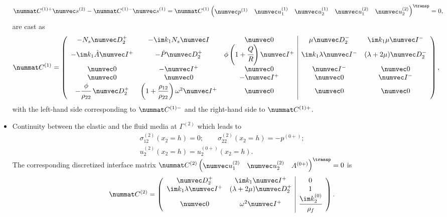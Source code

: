 \begin{itemize}
    \begin{equation}
        \nummat C^{(1)+} \numvec s^{(2)} - \nummat C^{(1)-} \numvec s^{(1)} =
        \nummat C^{(1)} \begin{pmatrix} \numvec p^{(1)} & \numvec u^{(1)}_{1} & \numvec u^{(1)}_{2} & \numvec u^{(2)}_{1} & \numvec u^{(2)}_{2}
        \end{pmatrix}^\transp = 0,
    \end{equation}
    are cast as
    \begin{equation} \nummat C^{(1)}  = 
       \left(
        \begin{array}{ccc|cc}
            - N_s\numvec D_{2}^+ & -\im  k_1  N_s \numvec I & \numvec 0 & \mu \numvec D_{2}^- & \im  k_1 \mu \numvec I^- \\
            -\im  k_1 \hat A \numvec I^+ & -\hat P \numvec D_{2}^+ & \phi \left(1 + \cfrac{ Q}{ R}\right) \numvec I^+ & \im  k_1 \lambda\numvec I^- & (\lambda + 2\mu )\numvec D_{2}^-  \\
            \numvec 0 & -\numvec I^+ & \numvec 0 & \numvec I^- & \numvec 0  \\
            \numvec 0 & \numvec 0 & -\numvec I^+ & \numvec 0 & \numvec I^-  \\
            -\cfrac{\phi}{ \rho_{22}} \:\numvec D_{2}^+ & \left( 1 +\displaystyle\frac{ \rho_{12}} { \rho_{22}} \right)\omega^2\numvec I^+ & \numvec 0 & \numvec 0 & \numvec 0 \\
        \end{array} \right),
        \label{eq:poro_elastic_cont_matrix}
    \end{equation}
    with the left-hand side corresponding to $\nummat C^{(1)-}$ and the right-hand side to $\nummat C^{(1)+}$.
    \item Continuity between the elastic and the fluid media at $\Gamma^{(2)}$ which leads to
    \begin{equation}
    \begin{array}{c}
            \sigma_{12}^{(2)}(x_2=h) = 0; \quad \quad \sigma_{22}^{(2)}(x_2=h) = -p^{(0+)}; \\ 
             u_2^{(2)}(x_2=h)=u_2^{(0+)}(x_2=h).
             \end{array}
    \end{equation}
    The corresponding discretized interface matrix $\nummat C^{(2)} \begin{pmatrix} \numvec u^{(2)}_1 & \numvec u^{(2)}_2 & A^{(0+)}\end{pmatrix}^\transp = 0$ is 
        \begin{equation} \nummat C^{(2)} = 
            \left( \begin{array}{cc|c}
                    \numvec D_{2}^+ & \im  k_1 \numvec I^+ & 0 \\
                    \im  k_1 \lambda \numvec I^+ & (\lambda + 2\mu)\numvec D_{2}^+ & 1 \\
                    \numvec 0 & \omega^2 \numvec I^+ & \cfrac {\im k_2^{(0)}}{\rho_f}
                \end{array} \right).
            \label{eq:elastic_fluid_cont_matrix}
        \end{equation}
    \end{itemize}
    
